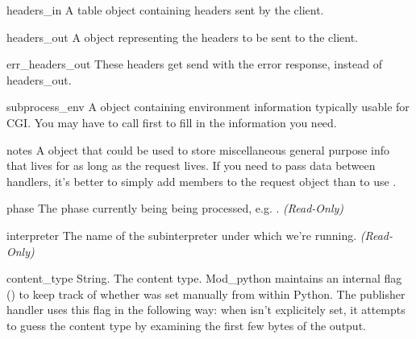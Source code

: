 \begin{memberdesc}[request]{headers_in}
  A table object containing headers sent by the client.
\end{memberdesc}

\begin{memberdesc}[request]{headers_out}
  A  object representing the headers to be sent to the
  client. 
\end{memberdesc}

\begin{memberdesc}[request]{err_headers_out}
  These headers get send with the error response, instead of
  headers_out.
\end{memberdesc}

\begin{memberdesc}[request]{subprocess_env}
  A  object containing environment information typically usable for CGI.
  You may have to call  first to fill in the information
  you need.
\end{memberdesc}

\begin{memberdesc}[request]{notes}
  A  object that could be used to store miscellaneous
  general purpose info that lives for as long as the request lives. If
  you need to pass data between handlers, it's better to simply add
  members to the request object than to use .
\end{memberdesc}

\begin{memberdesc}[request]{phase}
  The phase currently being being processed, e.g. .
  \emph{(Read-Only)}
\end{memberdesc}

\begin{memberdesc}[request]{interpreter}
  The name of the subinterpreter under which we're running.
  \emph{(Read-Only)}
\end{memberdesc}

\begin{memberdesc}[request]{content_type}
  String. The content type. Mod_python maintains an internal flag
  () to keep track of whether
   was set manually from within Python. The
  publisher handler uses this flag in the following way: when
   isn't explicitely set, it attempts to guess the
  content type by examining the first few bytes of the output.
\end{memberdesc}

